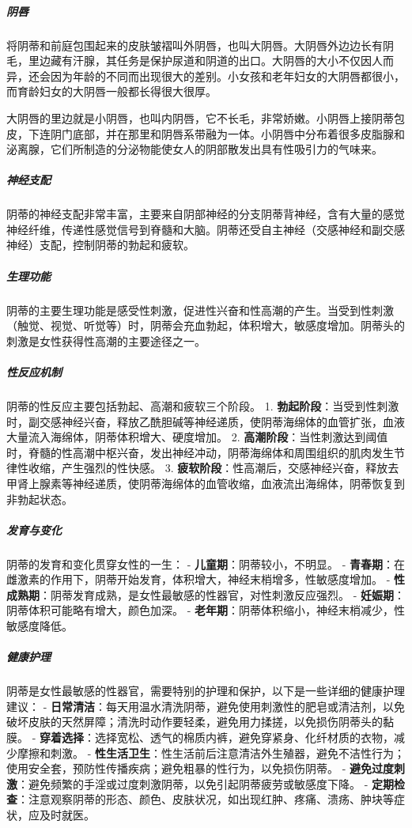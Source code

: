 \begin{enumerate}
\subparagraph{阴唇}
将阴蒂和前庭包围起来的皮肤皱褶叫外阴唇，也叫大阴唇。大阴唇外边边长有阴毛，里边藏有汗腺，其任务是保护尿道和阴道的出口。大阴唇的大小不仅因人而异，还会因为年龄的不同而出现很大的差别。小女孩和老年妇女的大阴唇都很小，而育龄妇女的大阴唇一般都长得很大很厚。

大阴唇的里边就是小阴唇，也叫内阴唇，它不长毛，非常娇嫩。小阴唇上接阴蒂包皮，下连阴门底部，并在那里和阴唇系带融为一体。小阴唇中分布着很多皮脂腺和泌离腺，它们所制造的分泌物能使女人的阴部散发出具有性吸引力的气味来。

\subparagraph{神经支配}
阴蒂的神经支配非常丰富，主要来自阴部神经的分支阴蒂背神经，含有大量的感觉神经纤维，传递性感觉信号到脊髓和大脑。阴蒂还受自主神经（交感神经和副交感神经）支配，控制阴蒂的勃起和疲软。

\subparagraph{生理功能}
阴蒂的主要生理功能是感受性刺激，促进性兴奋和性高潮的产生。当受到性刺激（触觉、视觉、听觉等）时，阴蒂会充血勃起，体积增大，敏感度增加。阴蒂头的刺激是女性获得性高潮的主要途径之一。

\subparagraph{性反应机制}
阴蒂的性反应主要包括勃起、高潮和疲软三个阶段。
1. \textbf{勃起阶段}：当受到性刺激时，副交感神经兴奋，释放乙酰胆碱等神经递质，使阴蒂海绵体的血管扩张，血液大量流入海绵体，阴蒂体积增大、硬度增加。
2. \textbf{高潮阶段}：当性刺激达到阈值时，脊髓的性高潮中枢兴奋，发出神经冲动，阴蒂海绵体和周围组织的肌肉发生节律性收缩，产生强烈的性快感。
3. \textbf{疲软阶段}：性高潮后，交感神经兴奋，释放去甲肾上腺素等神经递质，使阴蒂海绵体的血管收缩，血液流出海绵体，阴蒂恢复到非勃起状态。

\subparagraph{发育与变化}
阴蒂的发育和变化贯穿女性的一生：
- \textbf{儿童期}：阴蒂较小，不明显。
- \textbf{青春期}：在雌激素的作用下，阴蒂开始发育，体积增大，神经末梢增多，性敏感度增加。
- \textbf{性成熟期}：阴蒂发育成熟，是女性最敏感的性器官，对性刺激反应强烈。
- \textbf{妊娠期}：阴蒂体积可能略有增大，颜色加深。
- \textbf{老年期}：阴蒂体积缩小，神经末梢减少，性敏感度降低。

\subparagraph{健康护理}
阴蒂是女性最敏感的性器官，需要特别的护理和保护，以下是一些详细的健康护理建议：
- \textbf{日常清洁}：每天用温水清洗阴蒂，避免使用刺激性的肥皂或清洁剂，以免破坏皮肤的天然屏障；清洗时动作要轻柔，避免用力揉搓，以免损伤阴蒂头的黏膜。
- \textbf{穿着选择}：选择宽松、透气的棉质内裤，避免穿紧身、化纤材质的衣物，减少摩擦和刺激。
- \textbf{性生活卫生}：性生活前后注意清洁外生殖器，避免不洁性行为；使用安全套，预防性传播疾病；避免粗暴的性行为，以免损伤阴蒂。
- \textbf{避免过度刺激}：避免频繁的手淫或过度刺激阴蒂，以免引起阴蒂疲劳或敏感度下降。
- \textbf{定期检查}：注意观察阴蒂的形态、颜色、皮肤状况，如出现红肿、疼痛、溃疡、肿块等症状，应及时就医。


\end{enumerate}
